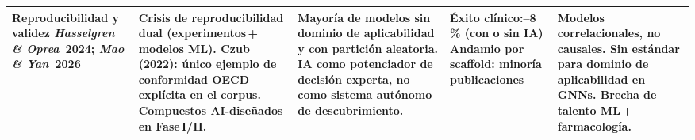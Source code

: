 \begin{landscape}
\begin{table}[h!]
\begin{tabular}{
  P{2.4cm}
  P{4.2cm}
  P{5.0cm}
  P{3.2cm}
  P{4.6cm}
}
\midrule

\textbf{Reproducibilidad y validez}\newline
\emph{Hasselgren \& Oprea}\ 2024;\newline
\emph{Mao \& Yan}\ 2026 &
Crisis de reproducibilidad dual (experimentos\,+\,modelos ML).
Czub\,(2022): único ejemplo de conformidad OECD explícita en el
corpus. Compuestos AI-diseñados en Fase\,I/II. &
Mayoría de modelos sin dominio de aplicabilidad y con partición
aleatoria. IA como potenciador de decisión experta, no como
sistema autónomo de descubrimiento. &
Éxito clínico:--8\,\% (con o sin IA)\newline
Andamio por scaffold:\newline
minoría publicaciones &
Modelos correlacionales, no causales. Sin estándar para dominio de
aplicabilidad en GNNs. Brecha de talento ML\,+\,farmacología. \\

\bottomrule
\end{tabular}

\vspace{3pt}

\end{table}

\end{landscape}